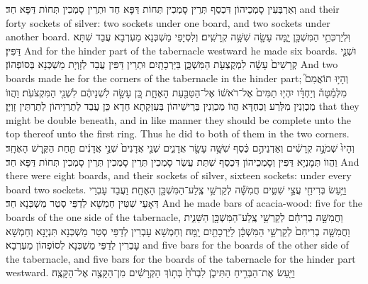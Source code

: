 {וְאַרְבְּעִין סָמְכֵיהוֹן דִּכְסַף תְּרֵין סָמְכִין תְּחוֹת דַּפָּא חַד וּתְרֵין סָמְכִין תְּחוֹת דַּפָּא חַד׃}
{and their forty sockets of silver: two sockets under one board, and two sockets under another board.}{}
{וּֽלְיַרְכְּתֵ֥י הַמִּשְׁכָּ֖ן יָ֑מָּה עָשָׂ֖ה שִׁשָּׁ֥ה קְרָשִֽׁים׃}
{וְלִסְיָפֵי מַשְׁכְּנָא מַעְרְבָא עֲבַד שִׁתָּא דַּפִּין׃}
{And for the hinder part of the tabernacle westward he made six boards.}{}
{וּשְׁנֵ֤י קְרָשִׁים֙ עָשָׂ֔ה לִמְקֻצְעֹ֖ת הַמִּשְׁכָּ֑ן בַּיַּרְכָתָֽיִם׃}
{וּתְרֵין דַּפִּין עֲבַד לְזָוְיָת מַשְׁכְּנָא בְּסוֹפְהוֹן׃}
{And two boards made he for the corners of the tabernacle in the hinder part;}{}
{וְהָי֣וּ תוֹאֲמִם֮ מִלְּמַ֒טָּה֒ וְיַחְדָּ֗ו יִהְי֤וּ תַמִּים֙ אֶל־רֹאשׁ֔וֹ אֶל־הַטַּבַּ֖עַת הָאֶחָ֑ת כֵּ֚ן עָשָׂ֣ה לִשְׁנֵיהֶ֔ם לִשְׁנֵ֖י הַמִּקְצֹעֹֽת׃}
{וַהֲווֹ מַכְוְנִין מִלְּרַע וְכַחְדָּא הֲווֹ מַכְוְנִין בְּרֵישֵׁיהוֹן בְּעִזְקְתָא חַדָא כֵּן עֲבַד לְתַרְוֵיהוֹן לְתַרְתֵּין זָוְיָן׃}
{that they might be double beneath, and in like manner they should be complete unto the top thereof unto the first ring. Thus he did to both of them in the two corners.}{}
{וְהָיוּ֙ שְׁמֹנָ֣ה קְרָשִׁ֔ים וְאַדְנֵיהֶ֣ם כֶּ֔סֶף שִׁשָּׁ֥ה עָשָׂ֖ר אֲדָנִ֑ים שְׁנֵ֤י אֲדָנִים֙ שְׁנֵ֣י אֲדָנִ֔ים תַּ֖חַת הַקֶּ֥רֶשׁ הָאֶחָֽד׃}
{וַהֲווֹ תְּמָנְיָא דַּפִּין וְסָמְכֵיהוֹן דִּכְסַף שִׁתַּת עֲשַׂר סָמְכִין תְּרֵין סָמְכִין תְּרֵין סָמְכִין תְּחוֹת דַּפָּא חַד׃}
{And there were eight boards, and their sockets of silver, sixteen sockets: under every board two sockets.}{}
{וַיַּ֥עַשׂ בְּרִיחֵ֖י עֲצֵ֣י שִׁטִּ֑ים חֲמִשָּׁ֕ה לְקַרְשֵׁ֥י צֶֽלַע־הַמִּשְׁכָּ֖ן הָאֶחָֽת׃}
{וַעֲבַד עָבְרֵי דְּאָעֵי שִׁטִּין חַמְשָׁא לְדַפֵּי סְטַר מַשְׁכְּנָא חַד׃}
{And he made bars of acacia-wood: five for the boards of the one side of the tabernacle,}{}
{וַחֲמִשָּׁ֣ה בְרִיחִ֔ם לְקַרְשֵׁ֥י צֶֽלַע־הַמִּשְׁכָּ֖ן הַשֵּׁנִ֑ית וַחֲמִשָּׁ֤ה בְרִיחִם֙ לְקַרְשֵׁ֣י הַמִּשְׁכָּ֔ן לַיַּרְכָתַ֖יִם יָֽמָּה׃}
{וְחַמְשָׁא עָבְרִין לְדַפֵּי סְטַר מַשְׁכְּנָא תִּנְיָנָא וְחַמְשָׁא עָבְרִין לְדַפֵּי מַשְׁכְּנָא לְסוֹפְהוֹן מַעְרְבָא׃}
{and five bars for the boards of the other side of the tabernacle, and five bars for the boards of the tabernacle for the hinder part westward.}{}
{וַיַּ֖עַשׂ אֶת־הַבְּרִ֣יחַ הַתִּיכֹ֑ן לִבְרֹ֙חַ֙ בְּת֣וֹךְ הַקְּרָשִׁ֔ים מִן־הַקָּצֶ֖ה אֶל־הַקָּצֶֽה׃}
